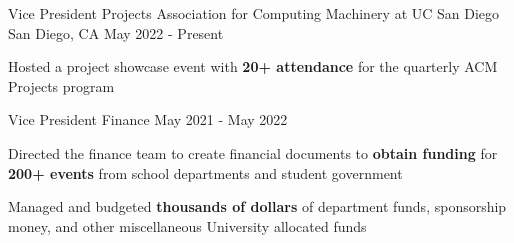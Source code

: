 \begin{cventries}

\cvtwoentry
{Vice President Projects}
{Association for Computing Machinery at UC San Diego}
{San Diego, CA}
{May 2022 - Present}
{
\begin{cvitems}
  \item Hosted a project showcase event with \textbf{20+ attendance} for the quarterly ACM Projects program 
\end{cvitems}
}
{Vice President Finance}
{May 2021 - May 2022}
{
\begin{cvitems}
  \item Directed the finance team to create financial documents to \textbf{obtain funding} for \textbf{200+ events} from school departments and student government
  \item Managed and budgeted \textbf{thousands of dollars} of department funds, sponsorship money, and other miscellaneous University allocated funds
\end{cvitems}
}

\end{cventries}